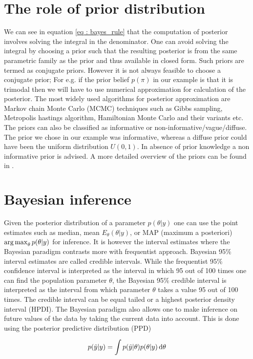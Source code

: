 \section{The role of prior distribution}
We can see in equation \ref{eq : bayes_rule} that the computation of posterior involves solving the integral in the denominator. One can avoid solving the integral by choosing a prior such that the resulting posterior is from the same parametric family as the prior and thus available in closed form. Such priors are termed as conjugate priors. However it is not always feasible to choose a conjugate prior; For e.g. if the prior belief $p(\pi)$ in our example is that it is trimodal then we will have to use numerical approximation for calculation of the posterior. The most widely used algorithms for posterior approximation are Markov chain Monte Carlo (MCMC) techniques such as Gibbs sampling, Metropolis hastings algorithm, Hamiltonian Monte Carlo and their variants etc. The priors can also be classified as informative or non-informative/vague/diffuse. The prior we chose in our example was informative, whereas a diffuse prior could have been the uniform distribution $U(0,1)$. In absence of prior knowledge a non informative prior is advised. A more detailed overview of the priors can be found in \citet{lesaffre_bayesian_2012}.

\section{Bayesian inference}
Given the posterior distribution of a parameter $p(\theta|y)$ one can use the point estimates such as median, mean $E_\theta(\theta|y)$, or MAP (maximum a posteriori) $\operatorname*{arg\,max}_\theta p(\theta|y)$ for inference. It is however the interval estimates where the Bayesian paradigm contrasts more with frequentist approach. Bayesian 95\% interval estimates are called credible intervals. While the frequentist 95\% confidence interval is interpreted as the interval in which 95 out of 100 times one can find the population parameter $\theta$, the Bayesian 95\% credible interval is interpreted as the interval from which parameter $\theta$ takes a value 95 out of 100 times. The credible interval can be equal tailed or a highest posterior density interval (HPDI). The Bayesian paradigm also allows one to make inference on future values of the data by taking the current data into account. This is done using the posterior predictive distribution (PPD)

$$p(\tilde{y}|y) = \int p(\tilde{y}|\theta) p(\theta|y) \mathop{}\!\mathrm{d}\theta$$

